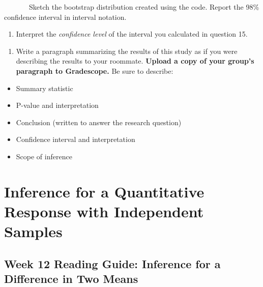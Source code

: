 \documentclass[
]{report}
\providecommand{\tightlist}{%
  \setlength{\itemsep}{0pt}\setlength{\parskip}{0pt}}
\begin{document}
\newpage

~~~~~~~Sketch the bootstrap distribution created using the code. Report the 98\% confidence interval in interval notation.

\vspace{1.5in}

\begin{enumerate}
\def\labelenumi{\arabic{enumi}.}
\setcounter{enumi}{15}
\tightlist
\item
  Interpret the \emph{confidence level} of the interval you calculated in question 15.
\end{enumerate}

\vspace{0.8in}

\begin{enumerate}
\def\labelenumi{\arabic{enumi}.}
\setcounter{enumi}{16}
\tightlist
\item
  Write a paragraph summarizing the results of this study as if you were describing the results to your roommate. \textbf{Upload a copy of your group's paragraph to Gradescope.} Be sure to describe:
\end{enumerate}

\begin{itemize}
\item
  Summary statistic
\item
  P-value and interpretation
\item
  Conclusion (written to answer the research question)
\item
  Confidence interval and interpretation
\item
  Scope of inference
\end{itemize}

\vspace{2.6in}

\newpage

\hypertarget{inference-for-a-quantitative-response-with-independent-samples}{%
\chapter{Inference for a Quantitative Response with Independent Samples}\label{inference-for-a-quantitative-response-with-independent-samples}}

\hypertarget{week-12-reading-guide-inference-for-a-difference-in-two-means}{%
\section{Week 12 Reading Guide: Inference for a Difference in Two Means}\label{week-12-reading-guide-inference-for-a-difference-in-two-means}}
\end{document}

